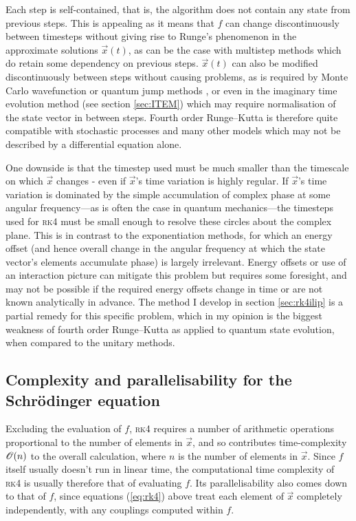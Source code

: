 Each step is self-contained, that is, the algorithm does not contain any state from previous steps. This is appealing as it means that $f$ can change discontinuously between timesteps without giving rise to Runge's phenomenon \cite{dahlquist2003numerical} in the approximate solutions $\vec x(t)$, as can be the case with multistep methods which do retain some dependency on previous steps.
$\vec x(t)$ can also be modified discontinuously between steps without causing problems, as is required by Monte Carlo wavefunction or quantum jump methods \cite{molmer_monte_1996, plenio_quantum-jump_1998}, or even in the imaginary time evolution method (see section \ref{sec:ITEM}) which may require normalisation of the state vector in between steps. Fourth order Runge--Kutta is therefore quite compatible with stochastic processes and many other models which may not be described by a differential equation alone.

One downside is that the timestep used must be much smaller than the timescale on which $\vec x$ changes - even if $\vec x$'s time variation is highly regular. If $\vec x$'s time variation is dominated by the simple accumulation of complex phase at some angular frequency---as is often the case in quantum mechanics---the timesteps used for \textsc{rk4} must be small enough to resolve these circles about the complex plane. This is in contrast to the exponentiation methods, for which an energy offset (and hence overall change in the angular frequency at which the state vector's elements accumulate phase) is largely irrelevant. Energy offsets or use of an interaction picture can mitigate this problem but requires some foresight, and may not be possible if the required energy offsets change in time or are not known analytically in advance. The method I develop in section \ref{sec:rk4ilip} is a partial remedy for this specific problem, which in my opinion is the biggest weakness of fourth order Runge--Kutta as applied to quantum state evolution, when compared to the unitary methods.

\subsection{Complexity and parallelisability for the Schr\"odinger equation}

Excluding the evaluation of $f$, \textsc{rk4} requires a number of arithmetic operations proportional to the number of elements in $\vec x$, and so contributes time-complexity $\mathscr{O}(n)$ to the overall calculation, where $n$ is the number of elements in $\vec x$. Since $f$ itself usually doesn't run in linear time, the computational time complexity of \textsc{rk4} is usually therefore that of evaluating $f$. Its parallelisability also comes down to that of $f$, since equations (\ref{eq:rk4}) above treat each element of $\vec x$ completely independently, with any couplings computed within $f$.

